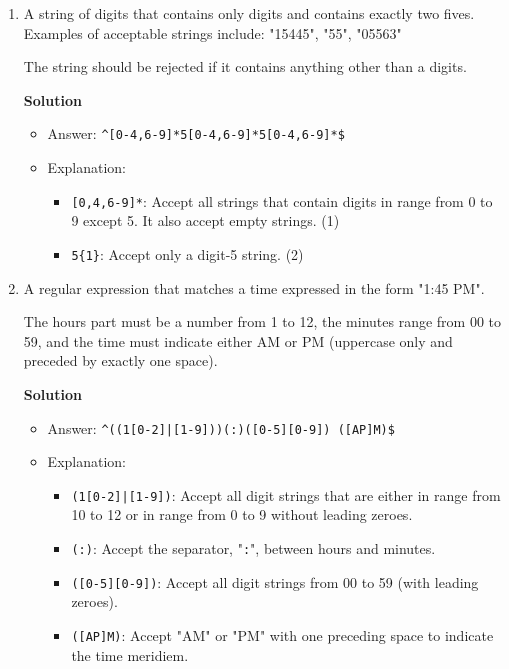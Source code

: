 \documentclass[12pt]{article}
\begin{document}
\begin{enumerate}
    \item A string of digits that contains only digits and contains exactly two fives. Examples of acceptable strings include: "15445", "55", "05563"

          The string should be rejected if it contains anything other than a digits.

          \centerline{\textbf{Solution}}

          \begin{itemize}
              \item Answer: \texttt{\^}\texttt{[0-4,6-9]*5[0-4,6-9]*5[0-4,6-9]*\$}
              \item Explanation:

                    \begin{itemize}
                        \item \texttt{[0,4,6-9]*}: Accept all strings that contain digits in range from 0 to 9 except 5. It also accept empty strings. (1)
                        \item \texttt{5\{1\}}: Accept only a digit-5 string. (2)
                    \end{itemize}
          \end{itemize}

    \item A regular expression that matches a time expressed in the form "1:45 PM".

          The hours part must be a number from 1 to 12, the minutes range from 00 to 59, and the time must indicate either AM or PM (uppercase only and preceded by exactly one space).

          \centerline{\textbf{Solution}}

          \begin{itemize}
              \item Answer: \texttt{\^}\texttt{((1[0-2]|[1-9]))(:)([0-5][0-9]) ([AP]M)\$}
              \item Explanation:

                    \begin{itemize}
                        \item \texttt{(1[0-2]|[1-9])}: Accept all digit strings that are either in range from 10 to 12 or in range from 0 to 9 without leading zeroes.
                        \item \texttt{(:)}: Accept the separator, "\texttt{:}", between hours and minutes.
                        \item \texttt{([0-5][0-9])}: Accept all digit strings from 00 to 59 (with leading zeroes).
                        \item \texttt{([AP]M)}: Accept "AM" or "PM" with one preceding space to indicate the time meridiem.
                    \end{itemize}
          \end{itemize}


\end{enumerate}
\end{document}
